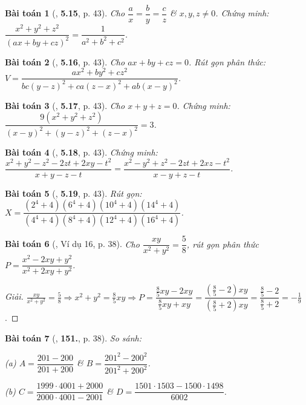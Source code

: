 \documentclass{article}
\numberwithin{equation}{section}
\newtheorem{baitoan}{Bài toán}
\begin{document}
\begin{baitoan}[\cite{Binh_Nam_Ngoc_Son_Toan_8_Dai_So}, \textbf{5.15}, p. 43]
	Cho $\dfrac{a}{x} = \dfrac{b}{y} = \dfrac{c}{z}$ \& $x,y,z\ne 0$. Chứng minh: $\dfrac{x^2 + y^2 + z^2}{(ax + by + cz)^2} = \dfrac{1}{a^2 + b^2 + c^2}$.
\end{baitoan}

\begin{baitoan}[\cite{Binh_Nam_Ngoc_Son_Toan_8_Dai_So}, \textbf{5.16}, p. 43]
	Cho $ax + by + cz = 0$. Rút gọn phân thức: $V = \dfrac{ax^2 + by^2 + cz^2}{bc(y - z)^2 + ca(z - x)^2 + ab(x - y)^2}$.
\end{baitoan}

\begin{baitoan}[\cite{Binh_Nam_Ngoc_Son_Toan_8_Dai_So}, \textbf{5.17}, p. 43]
	Cho $x + y + z = 0$. Chứng minh: $\dfrac{9(x^2 + y^2 + z^2)}{(x - y)^2 + (y - z)^2 + (z - x)^2} = 3$.
\end{baitoan}

\begin{baitoan}[\cite{Binh_Nam_Ngoc_Son_Toan_8_Dai_So}, \textbf{5.18}, p. 43]
	Chứng minh: $\dfrac{x^2 + y^2 - z^2 - 2zt + 2xy - t^2}{x + y - z - t} = \dfrac{x^2 - y^2 + z^2 - 2zt + 2xz - t^2}{x - y + z - t}$.
\end{baitoan}

\begin{baitoan}[\cite{Binh_Nam_Ngoc_Son_Toan_8_Dai_So}, \textbf{5.19}, p. 43]
	Rút gọn: $X = \dfrac{(2^4 + 4)(6^4 + 4)(10^4 + 4)(14^4 + 4)}{(4^4 + 4)(8^4 + 4)(12^4 + 4)(16^4 + 4)}$.
\end{baitoan}

\begin{baitoan}[\cite{Tuyen_Toan_8}, Ví dụ 16, p. 38]
	Cho $\dfrac{xy}{x^2 + y^2} = \dfrac{5}{8}$, rút gọn phân thức $P = \dfrac{x^2 - 2xy + y^2}{x^2 + 2xy + y^2}$.
\end{baitoan}

\begin{proof}[Giải]
	$\frac{xy}{x^2 + y^2} = \frac{5}{8}\Rightarrow x^2 + y^2 = \frac{8}{5}xy\Rightarrow P = \dfrac{\frac{8}{5}xy - 2xy}{\frac{8}{5}xy + xy} = \dfrac{\left(\frac{8}{5} - 2\right)xy}{\left(\frac{8}{5} + 2\right)xy} = \dfrac{\frac{8}{5} - 2}{\frac{8}{5} + 2} = -\frac{1}{9}$.
\end{proof}

\begin{baitoan}[\cite{Tuyen_Toan_8}, \textbf{151.}, p. 38]
	So sánh:
	\begin{enumerate*}
		\item[(a)] $A = \dfrac{201 - 200}{201 + 200}$ \& $B = \dfrac{201^2 - 200^2}{201^2 + 200^2}$.
		\item[(b)] $C = \dfrac{1999\cdot 4001 + 2000}{2000\cdot 4001 - 2001}$ \& $D = \dfrac{1501\cdot 1503 - 1500\cdot 1498}{6002}$.
	\end{enumerate*}
\end{baitoan}
\end{document}
